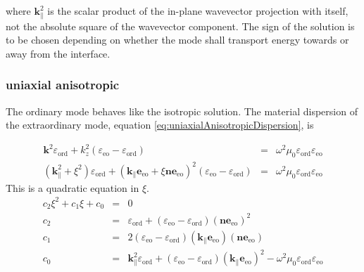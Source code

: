 \documentclass[12pt,a4paper,twoside,openright,BCOR10mm,headsepline,titlepage,abstracton,chapterprefix,final]{scrreprt}
\newcommand\Vector[1]{{\mathbf{#1}}}
\newcommand\vacuum{0}
\newcommand\wavenumber{k}
\newcommand\Wavevector{\Vector{\wavenumber}}
\newcommand\vacuumpermeability{\scalarpermeability_{\vacuum}}
\newcommand\scalarpermeability{\mu}
\newcommand\scalarpermittivity{\varepsilon}
\newcommand\ordi{\text{ord}}
\newcommand\eo{\text{eo}}
\begin{document}
where $\Wavevector_{\parallel}^2$ is the scalar product of the in-plane wavevector projection with itself, 
not the absolute square of the wavevector component.
The sign of the solution is to be chosen depending on whether the mode shall transport energy towards or away from the interface.

\subsubsection{uniaxial anisotropic}
The ordinary mode behaves like the isotropic solution.
The material dispersion of the extraordinary mode, equation \ref{eq:uniaxialAnisotropicDispersion}, is

\begin{eqnarray}
 \Wavevector^2 \scalarpermittivity_{\ordi} 
 + \wavenumber_{z}^2 (\scalarpermittivity_{\eo} - \scalarpermittivity_{\ordi})
 &=& \omega^2 \vacuumpermeability \scalarpermittivity_{\ordi} \scalarpermittivity_{\eo} 
 \\
 (\Wavevector_{\parallel}^2 + \xi^2) \scalarpermittivity_{\ordi} 
 + (\Wavevector_{\parallel} \Vector{e}_{\eo} + \xi \Vector{n}\Vector{e}_{\eo})^2 (\scalarpermittivity_{\eo} - \scalarpermittivity_{\ordi})
 &=& \omega^2 \vacuumpermeability \scalarpermittivity_{\ordi} \scalarpermittivity_{\eo}  
\end{eqnarray}
This is a quadratic equation in $\xi$.
\begin{eqnarray}
 c_2 \xi^2 + c_1 \xi + c_0 &=& 0
 \\
 c_2 &=& \scalarpermittivity_{\ordi} + (\scalarpermittivity_{\eo} - \scalarpermittivity_{\ordi}) (\Vector{n}\Vector{e}_{\eo})^2
 \nonumber 
 \\
 c_1 &=& 2 (\scalarpermittivity_{\eo} - \scalarpermittivity_{\ordi}) (\Wavevector_{\parallel} \Vector{e}_{\eo}) (\Vector{n}\Vector{e}_{\eo})
 \nonumber 
 \\
 c_0 &=& \Wavevector_{\parallel}^2 \scalarpermittivity_{\ordi} + (\scalarpermittivity_{\eo} - \scalarpermittivity_{\ordi}) (\Wavevector_{\parallel} \Vector{e}_{\eo})^2 
       - \omega^2 \vacuumpermeability \scalarpermittivity_{\ordi} \scalarpermittivity_{\eo} 
 \nonumber
\end{eqnarray}
\end{document}
